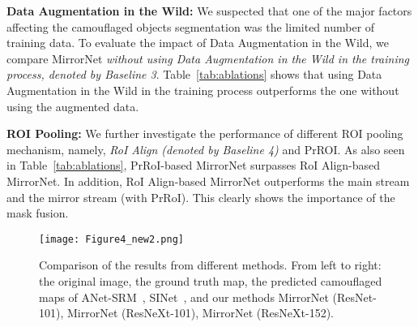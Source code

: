 \documentclass[journal]{IEEEtran}
\begin{document}
\textbf{Data Augmentation in the Wild: } We suspected that one of the major factors affecting the camouflaged objects segmentation was the limited number of training data. To evaluate the impact of Data Augmentation in the Wild, we compare MirrorNet \textit{without using Data Augmentation in the Wild in the training process, denoted by Baseline 3}. Table~\ref{tab:ablations} shows that using Data Augmentation in the Wild in the training process outperforms the one without using the augmented data. 

\textbf{ROI Pooling: } We further investigate the performance of different ROI pooling mechanism, namely, \textit{RoI Align (denoted by Baseline 4)} and PrROI. As also seen in Table~\ref{tab:ablations}, PrRoI-based MirrorNet surpasses RoI Align-based MirrorNet. In addition, RoI Align-based MirrorNet outperforms the main stream and the mirror stream (with PrRoI). This clearly shows the importance of the mask fusion. 





\begin{figure*}[!t]
	\centering
	\texttt{[image: Figure4\_new2.png]}
\caption{Comparison of the results from different methods. From left to right: the original image, the ground truth map, the predicted camouflaged maps of ANet-SRM~\cite{CAMO}, SINet~\cite{sinet}, and our methods MirrorNet (ResNet-101), MirrorNet (ResNeXt-101), MirrorNet (ResNeXt-152). 
}
	\label{fig:baselines}
\end{figure*}
\end{document}
